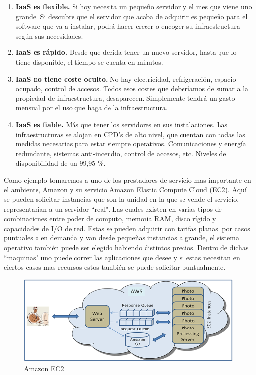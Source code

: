 \documentclass[12pt,a4paper]{article}
\begin{document}
\begin{enumerate}

\item \textbf{IaaS es flexible.} Si hoy necesita un pequeño servidor y el mes que viene uno grande. 
Si descubre que el servidor que acaba de adquirir es pequeño para el software que va a instalar, 
podrá hacer crecer o encoger su infraestructura según sus necesidades.

\item \textbf{IaaS es rápido.} Desde que decida tener un nuevo servidor, hasta que lo tiene 
disponible, el tiempo se cuenta en minutos.

\item \textbf{IaaS no tiene coste oculto.} No hay electricidad, refrigeración, espacio ocupado, 
control de accesos. Todos esos costes que deberíamos de sumar a la propiedad de infraestructura, 
desaparecen. Simplemente tendrá un gasto mensual por el uso que haga de la infraestructura.

\item \textbf{IaaS es fiable.} Más que tener los servidores en sus instalaciones. Las 
infraestructuras se alojan en CPD’s de alto nivel, que cuentan con todas las medidas necesarias para 
estar siempre operativos. Comunicaciones y energía redundante, sistemas anti-incendio, control de 
accesos, etc. Niveles de disponibilidad de un 99,95 \%.

\end{enumerate}

Como ejemplo tomaremos a uno de los prestadores de servicio mas importante en el ambiente, Amazon y 
su servicio Amazon Elastic Compute Cloud (EC2). Aquí se pueden solicitar instancias que son la unidad 
en la que se vende el servicio, representarían a un servidor ``real". Las cuales existen en varias 
tipos de combinaciones entre poder de computo, memoria RAM, disco rígido y capacidades de I/O de red.
Estas se pueden adquirir con tarifas planas, por casos puntuales o en demanda y van desde pequeñas 
instancias a grande, el sistema operativo también puede ser elegido habiendo distintos precios. 
Dentro de dichas ``maquinas" uno puede correr las aplicaciones que desee y si estas necesitan en 
ciertos casos mas recursos estos también se puede solicitar puntualmente.

\begin{figure}[h!]
 \centering
 \includegraphics[width=1\textwidth]{159_madhu.png}
\caption[Amazon EC2]{Amazon EC2}
\end{figure}
\end{document}
